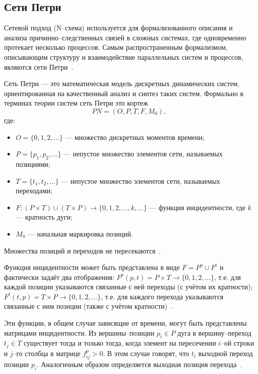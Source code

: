\subsection{Сети Петри}
Сетевой подход (N--схема) используется для формализованного описания и анализа причинно--следственных связей в сложных системах, где одновременно протекает несколько процессов. Самым распространенным формализмом, описывающим структуру и взаимодействие параллельных систем и процессов, являются сети Петри~\cite{sheme_types}.

Сеть Петри --- это математическая модель дискретных динамических систем, ориентированная на качественный анализ и синтез таких систем. Формально в терминах теории систем сеть Петри это кортеж
\begin{equation}
	\label{eq:smo_a}
	PN = (O,P,T,F,M_0),
\end{equation} где:
\begin{itemize}[label=---]
	\item $O=\{0,1,2,\ldots\}$ --- множество дискретных моментов времени;
	\item $P=\{p_1,p_2,\ldots\}$ --- непустое множество элементов сети, называемых позициями;
	\item $T=\{t_1,t_2,\ldots\}$ --- непустое множество элементов сети, называемых переходами;
	\item $F:(P \times T) \cup(T \times P) \rightarrow\{0,1,2, \ldots, k, \ldots\}$ --- функция инцидентности, где $k$ --- кратность дуги;
	\item $M_0$ --- начальная маркировка позиций.
\end{itemize}
Множества позиций и переходов не пересекаются~\cite{petri}.

Функция инцидентности может быть представлена в виде $F = F^p \cup F^t$ и фактически задаёт два отображения: $F^p(p,t) = P \times T \rightarrow\{0,1,2, \ldots\}$, т.е. для каждой позиции указываются связанные с ней переходы (с учётом их кратности); $F^t(t, p) = T \times P \rightarrow\{0,1,2, \ldots\}$, т.е. для каждого перехода указываются связанные с ним позиции (также с учётом кратности)~\cite{petri}. 

Эти функции, в общем случае зависящие от времени, могут быть представлены матрицами инцидентности. Из вершины--позиции $p_i \in P$ дуга в вершину--переход $t_j \in T$ существует тогда и только тогда, когда элемент на пересечении $i$--ой строки и $j$--го столбца в матрице $f_{ij}^p > 0$. В этом случае говорят, что $t_i$ выходной переход позиции $p_i$. Аналогичным образом определяется выходная позиция перехода~\cite{petri}.

